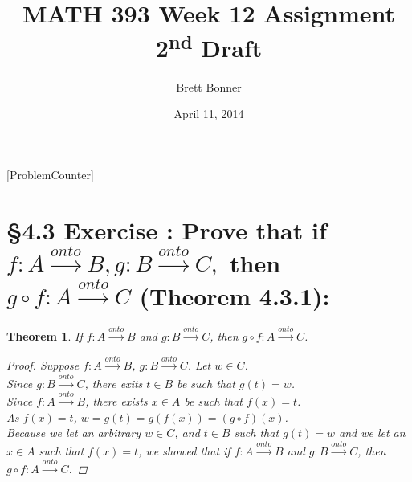 \documentclass[a4paper,11pt]{article}
\begin{document}
\newtheorem*{theorem1}{Theorem}
\newtheorem*{theorem2}{Theorem}
\newtheorem*{theorem3}{Theorem}
\newtheorem*{theorem4}{Theorem}
\newtheorem*{theorem5}{Theorem}
\newtheorem*{theorem6}{Theorem}
\newtheorem*{theorem7}{Theorem}
\newtheorem*{theorem8}{Theorem}
\newtheorem*{theorem9}{True/False?}
\title{MATH 393 Week 12 Assignment 2\textsuperscript{nd} Draft}
\author{Brett Bonner}
\date{April 11, 2014}
\maketitle
\doublespacing
{}
[ProblemCounter]
\newpage
\setcounter{ProblemCounter}{5}
\section*{\S 4.3 Exercise : Prove that if \(f:A \xrightarrow{onto} B, g:B \xrightarrow{onto} C,\) then \(g \circ f: A \xrightarrow{onto} C\) (Theorem 4.3.1):}
\setcounter{SubsectionCounter}{1}
\begin{theorem1}
  If \(f:A\xrightarrow{onto}B\) and \(g:B\xrightarrow{onto}C\), then \(g \circ f: A\xrightarrow{onto} 
  C\).
  \begin{proof}
Suppose \(f:A\xrightarrow{onto}B\),  \(g:B\xrightarrow{onto}C\). Let \(w \in C\).\\
Since \(g:B\xrightarrow{onto}C\), there exits \(t \in B\) be such that \(g{(t)}=w\).\\
Since \(f:A \xrightarrow{onto} B\), there exists \(x \in A\) be such that \(f{(x)}=t\).\\
As \(f{(x)}=t\), \(w=g{(t)}=g{(f{(x)})}={(g \circ f)}{(x)}\).\\
Because we let an arbitrary \(w \in C\), and \(t \in B\) such that \(g{(t)}=w\)
and we let an \(x \in A\) such that \(f{(x)}=t\), we showed that if \(f:A\xrightarrow{onto}B\) 
and \(g:B\xrightarrow{onto}C\), then \(g \circ f: A\xrightarrow{onto} 
  C\).
  \end{proof}
\end{theorem1}
\newpage
\addtocounter{ProblemCounter}{1}
\end{document}
